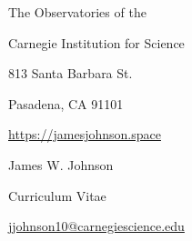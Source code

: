 \documentclass[cv.tex]{subfiles}
\begin{document}
\begin{center}
\parbox{.38\textwidth}{%
	\raggedleft%
	\vspace{-1.5cm}%
	The Observatories of the \par
	Carnegie Institution for Science \par
	813 Santa Barbara St. \par
	Pasadena, CA 91101 \par
	\url{https://jamesjohnson.space}%
}%
\hspace{4mm}%
\vrule height 2.0cm width 0.4pt%
\hspace{4mm}%
\parbox{.56\textwidth}{%
	{%
	\vspace{-1.5cm}%
	\fontsize{30}{36} \selectfont James W. Johnson \par
	\fontsize{20}{25} \selectfont Curriculum Vitae \par
	\fontsize{11}{13} \selectfont%
	\vspace{0.08cm}%
	\href{mailto:jjohnson10@carnegiescience.edu}{jjohnson10@carnegiescience.edu}%
	\hspace{3mm}%
	}%
}%
\end{center}
\end{document}
